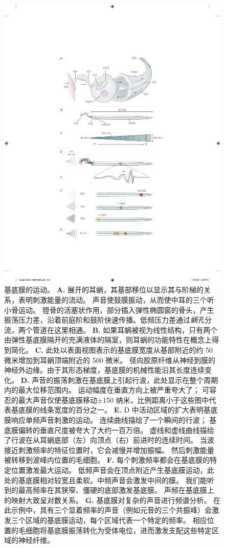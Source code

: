 \begin{figure}[htbp]
	\centering
	\includegraphics[width=0.65\linewidth]{chap26/fig_26_3}
	\caption{基底膜的运动。
		\textbf{A.} 展开的耳蜗，其基部移位以显示其与阶梯的关系，表明刺激能量的流动。
		声音使鼓膜振动，从而使中耳的三个听小骨运动。
		镫骨的活塞状作用，部分插入弹性椭圆窗的骨头，产生振荡压力差，沿着前庭阶和鼓阶快速传播。低频压力差通过\textit{蜗孔}分流，两个管道在这里相通。
		\textbf{B.} 如果耳蜗被视为线性结构，只有两个由弹性基底膜隔开的充满液体的隔室，则耳蜗的功能特性在概念上得到简化。
		\textbf{C.} 此处以表面视图表示的基底膜宽度从基部附近的约 50 微米增加到耳蜗顶端附近的 500 微米。
		径向胶原纤维从神经到膜的神经外边缘。由于其形态梯度，基底膜的机械性能沿其长度连续变化。
		\textbf{D.} 声音的振荡刺激在基底膜上引起行波，此处显示在整个周期内的最大位移范围内。
		运动幅度在垂直方向上被严重夸大了；
		可容忍的最大声音仅使基底膜移动±150 纳米，比例距离小于这些图中代表基底膜的线条宽度的百分之一。
		\textbf{E.} D 中活动区域的扩大表明基底膜响应单频声音刺激的运动。
		连续曲线描绘了一个瞬间的行波；
		基底膜偏转的垂直尺度被夸大了大约一百万倍。
		虚线和虚线曲线描绘了行波在从耳蜗底部（左）向顶点（右）前进时的连续时间。
		当波接近刺激频率的特征位置时，它会减慢并增加振幅。
		然后刺激能量被转移到波峰内位置的毛细胞。
		\textbf{F.} 每个刺激频率都会在基底膜的特定位置激发最大运动。
		低频声音会在顶点附近产生基底膜运动，此处的基底膜相对较宽且柔软。中频声音会激发中间的膜。
		我们能听到的最高频率在其狭窄、僵硬的底部激发基底膜。
		声频在基底膜上的映射大致呈对数关系。
		\textbf{G.} 基底膜对复杂的声音进行频谱分析。
		在此示例中，具有三个显着频率的声音（例如元音的三个共振峰）会激发三个区域的基底膜运动，每个区域代表一个特定的频率。
		相应位置的毛细胞将基底膜振荡转化为受体电位，进而激发支配这些特定区域的神经纤维。}
	\label{fig:26_3}
\end{figure}



